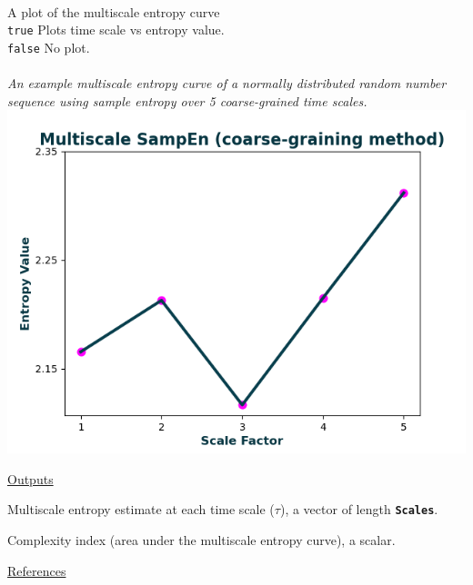 \documentclass[12pt, a4paper, titlepage, openany]{book}
\begin{document}
\begin{description}[labelsep=1cm, labelwidth=2cm, nosep, style=multiline,leftmargin=3cm]
\begin{description}[labelsep=5em, labelwidth=4em, nosep,style=multiline,leftmargin=2cm]
	\end{description}
\ \\ 
\item[\texttt{Plotx}]		A plot of the multiscale entropy curve\\
							\texttt{true} \hspace{15pt} Plots time scale vs entropy value.\\
							\texttt{false}\hspace{12pt} No plot.\\ \ \\
			\textit{An example multiscale entropy curve of a normally distributed random number sequence using sample entropy over 5 coarse-grained time scales.}\\
							\includegraphics[scale=.75]{MSEn1.png}
\end{description}

\noindent \ul{Outputs}
\begin{description}[labelsep=1cm, labelwidth=2cm, nosep, style=multiline,leftmargin=3cm]\footnotesize
\item[\texttt{MSx}]		Multiscale entropy estimate at each time scale ($\tau$), a vector of length 											\textbf{\texttt{Scales}}.
\item[\texttt{Ci}]		Complexity index (area under the multiscale entropy curve), a scalar.
\end{description}

\noindent \ul{References}\hspace{1cm}
\cite{MS1} \cite{MS2} \cite{MS3} \cite{MS4} \cite{MS5} \cite{MS6} \cite{MS7} \cite{MS8} \cite{MS9} \cite{MS10} \cite{MS11} \cite{MS12}
\end{document}

